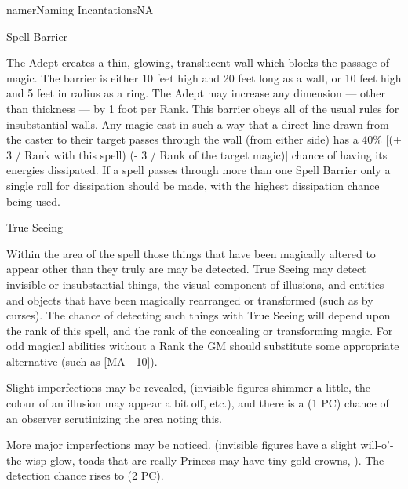 \begin{college}[2.0]{namer}{Naming Incantations}{NA}
\begin{spell}[S-9]{Spell Barrier}
\begin{effects}
The Adept creates a thin, glowing, translucent wall which blocks the
passage of magic. The barrier is either 10 feet high and 20 feet long
as a wall, or 10 feet high and 5 feet in radius as a ring. The Adept
may increase any dimension --- other than thickness --- by 1 foot per
Rank. This barrier obeys all of the usual rules for insubstantial
walls. Any magic cast in such a way that a direct line drawn from the
caster to their target passes through the wall (from either side) has
a 40\% [(+ 3 / Rank with this spell) (- 3 / Rank of the target magic)]
chance of having its energies dissipated. If a spell passes through
more than one Spell Barrier only a single roll for dissipation should
be made, with the highest dissipation chance being used.
\end{effects}
\end{spell}

\begin{spell}[S-10]{True Seeing}
\begin{effects}
Within the area of the spell those things that have been magically
altered to appear other than they truly are may be detected. True
Seeing may detect invisible or insubstantial things, the visual
component of illusions, and entities and objects that have been
magically rearranged or transformed (such as by curses). The chance of
detecting such things with True Seeing will depend upon the rank of
this spell, and the rank of the concealing or transforming magic. For
odd magical abilities without a Rank the GM should substitute some
appropriate alternative (such as [MA - 10]).

\begin{inline}
\begin{Description}
\item[True Seeing is of lesser or equal Rank] Slight imperfections may
be revealed, (\eg invisible figures shimmer a little, the colour of an
illusion may appear a bit off, etc.), and there is a (1 \x PC) chance
of an observer scrutinizing the area noting this.

\item[True Seeing is of higher Rank] More major imperfections may be
noticed. (\eg invisible figures have a slight will-o'-the-wisp glow,
toads that are really Princes may have tiny gold crowns, ). The
detection chance rises to (2 \x PC).


\end{Description}
\end{inline}
\end{effects}
\end{spell}
\end{college}
